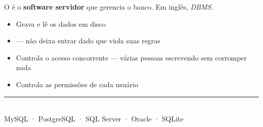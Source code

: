 \begin{frame}{}
  \vspace{0.5em}
  {\lexendlight O  é o \textbf{software servidor} que gerencia o banco.
  Em inglês, \emph{DBMS}.}

  \vspace{1em}
  \begin{itemize}
    \item Grava e lê os dados em disco
    \item {} — não deixa entrar dado que viola suas regras
    \item Controla o acesso concorrente — várias pessoas escrevendo sem corromper nada
    \item Controla as permissões de cada usuário
  \end{itemize}

  \vspace{1em}
  \begin{center}
    \textcolor{lightpurple}{\rule{0.5\linewidth}{1pt}}\\[.6em]
    {\small MySQL · PostgreSQL · SQL Server · Oracle · SQLite}
  \end{center}

\end{frame}

